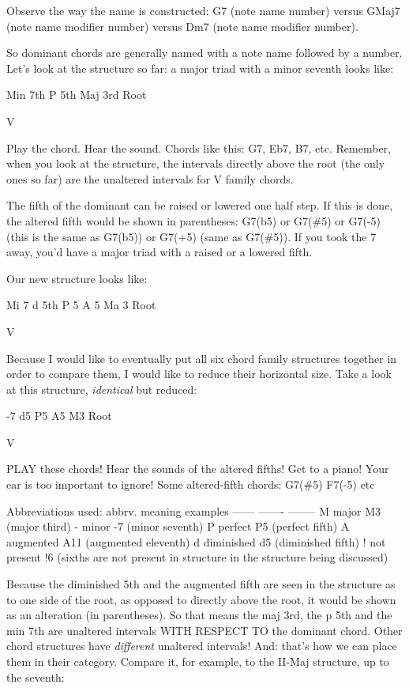 Observe the way the name is constructed: G7 (note name   number) versus
GMaj7 (note name  modifier  number) versus Dm7 (note name  modifier  number).

So dominant chords are generally named with a note name followed by a number.
Let's look at the structure so far: a major triad with a minor seventh looks
like:

        Min 7th
         P 5th
        Maj 3rd
         Root

          V

Play the chord. Hear the sound. Chords like this: G7, Eb7, B7, etc. Remember,
when you look at the structure, the intervals directly above the root (the
only ones so far) are the unaltered intervals for V family chords.

The fifth of the dominant can be raised or lowered one half step. If this is
done, the altered fifth would be shown in parentheses: G7(b5) or G7(\#5) or
G7(-5) (this is the same as G7(b5)) or G7(+5) (same as G7(\#5)). If you took
the 7 away, you'd have a major triad with a raised or a lowered fifth.

Our new structure looks like:

        Mi 7
 d 5th   P 5   A 5
        Ma 3
        Root

         V

Because I would like to eventually put all six chord family structures
together in order to compare them, I would like to reduce their horizontal
size. Take a look at this structure, \emph{identical} but reduced:

       -7
  d5   P5   A5
       M3
      Root

        V

PLAY these chords! Hear the sounds of the altered fifths! Get to a piano! Your
ear is too important to ignore! Some altered-fifth chords: G7(\#5) F7(-5) etc

Abbreviations used: 
abbrv.  meaning           examples
------  -------           --------
  M      major         M3 (major third)
  -      minor         -7 (minor seventh)
  P      perfect       P5 (perfect fifth)
  A     augmented     A11 (augmented eleventh)
  d     diminished     d5 (diminished fifth)
  !     not present    !6 (sixths are not present
        in structure       in the structure being
                           discussed)

Because the diminished 5th and the augmented fifth are seen in the structure as
to one side of the root, as opposed to directly above the root, it would be 
shown as an alteration (in parentheses). So that means the maj 3rd, the p 5th
and the min 7th are unaltered intervals WITH RESPECT TO the dominant chord.
Other chord structures have \emph{different} unaltered intervals! And: that's how
we can place them in their category. Compare it, for example, to the II-Maj
structure, up to the seventh:

